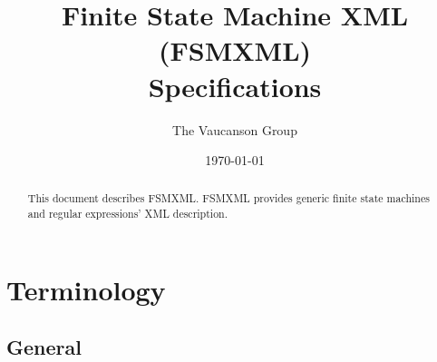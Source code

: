 \documentclass[a4paper]{article}
\begin{document}
\title{Finite State Machine XML (FSMXML)\\
  Specifications}
\author{The {\sc Vaucanson} Group}
\date{\today}
\maketitle

\begin{abstract}
This document describes FSMXML. FSMXML provides generic finite state
machines and regular expressions' XML description.
\end{abstract}

\tableofcontents{}

\newpage
\section{Terminology}

\subsection{General}
\end{document}
